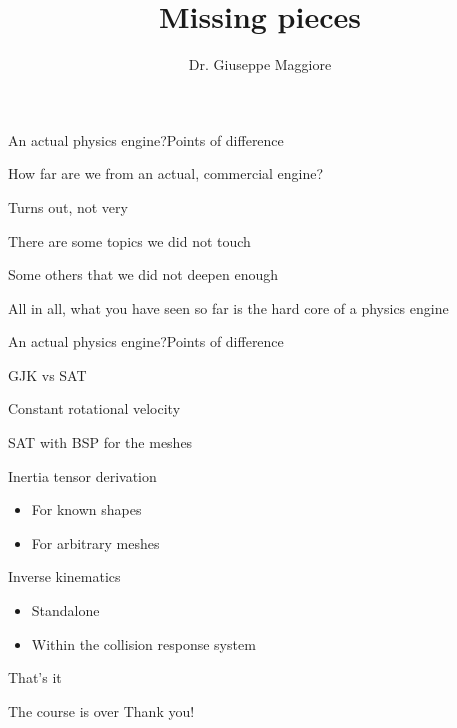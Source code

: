 \documentclass{beamer}
\title{Missing pieces}
\author{Dr. Giuseppe Maggiore}
\institute{NHTV University of Applied Sciences \\ 
Breda, Netherlands}
\date{}
\begin{document}
\maketitle

\begin{slide}{An actual physics engine?}{Points of difference}{
\item How far are we from an actual, commercial engine?
\item Turns out, not very
\item There are some topics we did not touch
\item Some others that we did not deepen enough
\item All in all, what you have seen so far is the hard core of a physics engine
}\end{slide}

\begin{slide}{An actual physics engine?}{Points of difference}{
\item GJK vs SAT
\pause
\item Constant rotational velocity
\pause
\item SAT with BSP for the meshes
\pause
\item Inertia tensor derivation
\begin{itemize}
\item For known shapes
\item For arbitrary meshes
\end{itemize}
\pause
\item Inverse kinematics
\begin{itemize}
\item Standalone
\item Within the collision response system
\end{itemize}
}\end{slide}

\begin{frame}{That's it}
\begin{block}{\center The course is over}
\center
\fontsize{18pt}{7.2}\selectfont
Thank you!
\end{block}
\end{frame}
\end{document}
